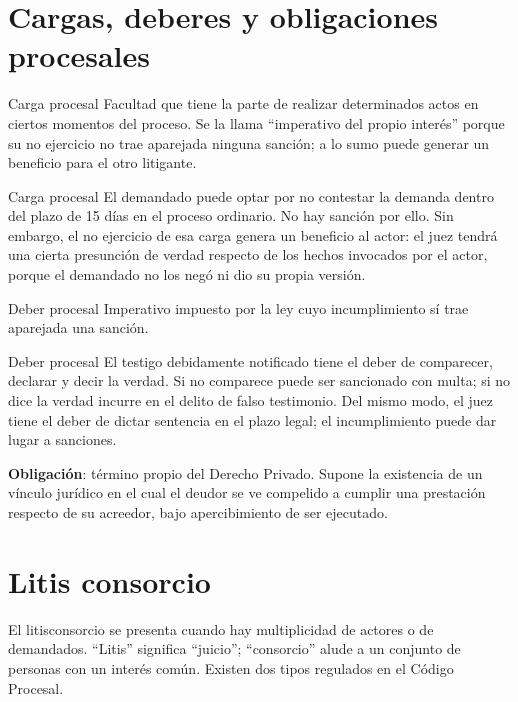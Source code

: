 \documentclass[12pt,oneside]{book}
\begin{document}
\section{Cargas, deberes y obligaciones procesales}

\begin{definition}{Carga procesal}
Facultad que tiene la parte de realizar determinados actos en ciertos momentos del proceso. Se la llama ``imperativo del propio interés'' porque su no ejercicio no trae aparejada ninguna sanción; a lo sumo puede generar un beneficio para el otro litigante.
\end{definition}

\begin{example}{Carga procesal}
El demandado puede optar por no contestar la demanda dentro del plazo de 15 días en el proceso ordinario. No hay sanción por ello. Sin embargo, el no ejercicio de esa carga genera un beneficio al actor: el juez tendrá una cierta presunción de verdad respecto de los hechos invocados por el actor, porque el demandado no los negó ni dio su propia versión.
\end{example}

\begin{definition}{Deber procesal}
Imperativo impuesto por la ley cuyo incumplimiento sí trae aparejada una sanción.
\end{definition}

\begin{example}{Deber procesal}
El testigo debidamente notificado tiene el deber de comparecer, declarar y decir la verdad. Si no comparece puede ser sancionado con multa; si no dice la verdad incurre en el delito de falso testimonio. Del mismo modo, el juez tiene el deber de dictar sentencia en el plazo legal; el incumplimiento puede dar lugar a sanciones.
\end{example}

\textbf{Obligación}: término propio del Derecho Privado. Supone la existencia de un vínculo jurídico en el cual el deudor se ve compelido a cumplir una prestación respecto de su acreedor, bajo apercibimiento de ser ejecutado.

\section{Litis consorcio}

El litisconsorcio se presenta cuando hay multiplicidad de actores o de demandados. ``Litis'' significa ``juicio''; ``consorcio'' alude a un conjunto de personas con un interés común. Existen dos tipos regulados en el Código Procesal.
\end{document}
